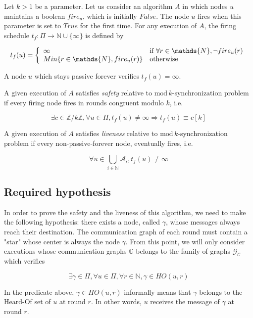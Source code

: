 \documentclass{article}
\newcommand{\cent}{\gamma}
\newcommand{\tf}{t_{f}}
\begin{document}
	Let $k > 1$ be a parameter. Let us consider an algorithm $A$ in which nodes $u$ maintains a boolean $fire_u$, which is initially $False$.
	The node $u$ fires when this parameter is set to $True$ for the first time.
	For any execution of $A$, the firing schedule $\tf: \Pi \rightarrow \mathds{N} \cup \{\infty\}$ is defined by 

	$$\tf(u) = \left \{
	\begin{array}{l l}
		\infty & \mbox{if}~\forall r \in \mathds{N}, \neg fire_u(r) \\
		Min \{r \in \mathds{N}, fire_u(r)\} & \mbox{otherwise}
	\end{array} \right.$$

	 A node $u$ which stays passive forever verifies $\tf(u) = \infty$.

	A given execution of $A$ satisfies \textit{safety} relative to $\mathrm{mod}\,k$-synchronization problem if every firing node fires in rounds congruent modulo $k$, i.e.

	$$\exists c \in \mathds{Z}/k\mathds{Z}, \forall u \in \Pi, \tf(u) \neq \infty \Rightarrow \tf(u) \equiv c[k]$$

	A given execution of $A$ satisfies \textit{liveness} relative to $\mathrm{mod}\,k$-synchronization problem if every non-passive-forever node, eventually fires, i.e.

	$$\forall u \in \bigcup\limits_{i \in \mathds{N}} \mathcal{A}_i, \tf(u) \neq \infty$$

\subsection{Required hypothesis}

In order to prove the safety and the liveness of this algorithm, we need to make the following hypothesis:
there exists a node, called $\cent$, whose messages always reach their destination.
The communication graph of each round must contain a "star" whose center is always the node $\cent$.
From this point, we will only consider executions whose communication graphs $\mathds{G}$ belongs to the family of graphs $\mathcal{G}_\mathcal{C}$ which verifies

$$\exists \cent \in \Pi, \forall u \in \Pi, \forall r \in \mathds{N}, \cent \in HO(u,r)$$

In the predicate above, $\cent \in HO(u,r)$ informally means that $\cent$ belongs to the Heard-Of set of $u$ at round $r$. In other words, $u$ receives the message of $\cent$ at round $r$.
\end{document}
